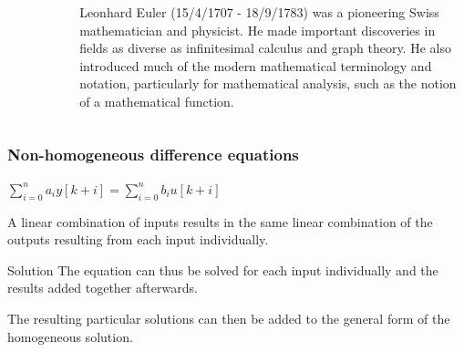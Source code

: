 \begin{frame}
	\begin{columns}
		\begin{column}{0.4\linewidth}
			\begin{figure}
			\centering
			\includegraphics[width=0.7\linewidth]{Images/Leonhard_Euler}

			\end{figure}
		\end{column}
		\begin{column}{0.6\linewidth}
			Leonhard Euler (15/4/1707 - 18/9/1783) was a pioneering Swiss mathematician and physicist. He made important discoveries in fields as diverse as infinitesimal calculus and graph theory. He also introduced much of the modern mathematical terminology and notation, particularly for mathematical analysis, such as the notion of a mathematical function.
		\end{column}
	\end{columns}
\end{frame}
\begin{frame}
	\frametitle{Non-homogeneous difference equations}
	\begin{definition}
		\begin{center}
			$\sum\limits_{i=0}^n a_iy[k+i] = \sum\limits_{i=0}^n b_iu[k+i]$\\
		\end{center}
	 	A linear combination of inputs results in the same linear combination of the outputs resulting from each input individually.
	\end{definition}
	\begin{block}{Solution}
		The equation can thus be solved for each input individually and the results added together afterwards.
			
		The resulting particular solutions can then be added to the general form of the homogeneous solution.
	\end{block}
\end{frame}
